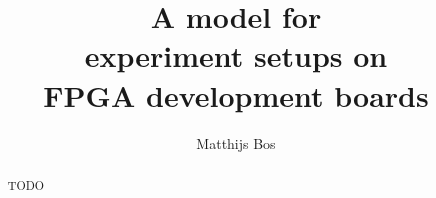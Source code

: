\documentclass[openright]{template/uva-bachelor-thesis}
\title{A model for \\experiment setups on\\ FPGA development boards}
\author{Matthijs Bos}
\begin{document}
 

\maketitle

\begin{abstract}
TODO
\end{abstract}

\tableofcontents















\appendix








\cleardoublepage

\restoregeometry


\printbibliography
\end{document}
